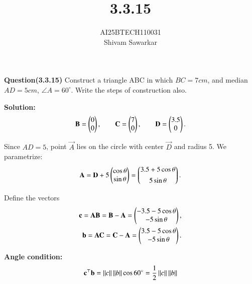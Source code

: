\documentclass[journal]{IEEEtran}
\begin{document}

\vspace{3cm}

\title{3.3.15}
\author{AI25BTECH110031 \\ Shivam Sawarkar}
 \maketitle
{\let\newpage\relax\maketitle}

\renewcommand{\thefigure}{\theenumi}
\renewcommand{\thetable}{\theenumi}
\setlength{\intextsep}{10pt} %


\renewcommand{\thetable}{\theenumi}

\textbf{Question(3.3.15)}
Construct a triangle ABC in which $BC = 7 cm$, and median $AD = 5 cm$, $\angle A=60^\circ$.
Write the steps of construction also.

\textbf{Solution:} \\ 
\begin{align}
\mathbf{B}=\begin{pmatrix}0\\0\end{pmatrix},\qquad 
\mathbf{C}=\begin{pmatrix}7\\0\end{pmatrix},\qquad 
\mathbf{D}=\begin{pmatrix}3.5\\0\end{pmatrix}.
\end{align}

Since $AD=5$, point $\vec{A}$ lies on the circle with center $\vec{D}$ and radius 5.  
We parametrize:
\begin{align}
\mathbf{A}=\mathbf{D}+5\begin{pmatrix}\cos\theta\\ \sin\theta\end{pmatrix}
=\begin{pmatrix}3.5+5\cos\theta\\[4pt]5\sin\theta\end{pmatrix}.
\end{align}

Define the vectors
\begin{align}
\mathbf{c}=\mathbf{AB}=\mathbf{B}-\mathbf{A}
=\begin{pmatrix}-3.5-5\cos\theta\\ -5\sin\theta\end{pmatrix},\\ 
\mathbf{b}=\mathbf{AC}=\mathbf{C}-\mathbf{A}
=\begin{pmatrix}3.5-5\cos\theta\\ -5\sin\theta\end{pmatrix}.
\end{align}

\textbf{Angle condition:}  
\begin{align}
\mathbf{c}^\top \mathbf{b}=\left\lVert c\right\rVert\left\lVert b\right\rVert\cos60^\circ
=\dfrac{1}{2}\left\lVert c\right\rVert\left\lVert b\right\rVert
\end{align}
\end{document}
